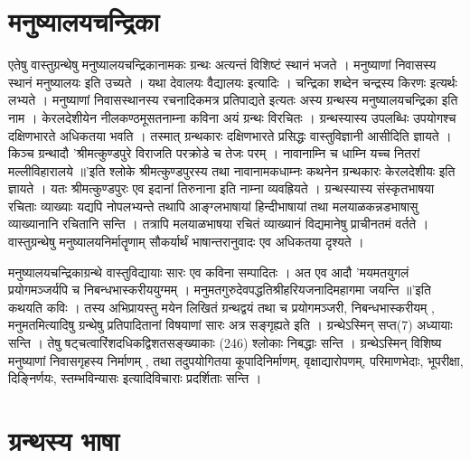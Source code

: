 \section{मनुष्यालयचन्द्रिका}

एतेषु वास्तुग्रन्थेषु मनुष्यालयचन्द्रिकानामकः ग्रन्थः अत्यन्तं विशिष्टं स्थानं भजते । मनुष्याणां निवासस्य स्थानं मनुष्यालयः इति उच्यते । यथा देवालयः वैद्यालयः इत्यादिः । चन्द्रिका शब्देन चन्द्रस्य किरणः इत्यर्थः लभ्यते । मनुष्याणां निवासस्थानस्य रचनादिकमत्र प्रतिपाद्यते इत्यतः अस्य ग्रन्थस्य मनुष्यालयचन्द्रिका इति नाम । केरलदेशीयेन नीलकण्ठमूसतनाम्ना कविना अयं ग्रन्थः विरचितः । ग्रन्थस्यास्य उपलब्धिः उपयोगश्च दक्षिणभारते अधिकतया भवति । तस्मात् ग्रन्थकारः दक्षिणभारते प्रसिद्धः वास्तुविज्ञानी आसीदिति ज्ञायते । किञ्च ग्रन्थादौ 'श्रीमत्कुण्डपुरे विराजति परक्रोडे च तेजः परम् । नावानाम्नि च धाम्नि यच्च नितरां मल्लीविहारालये ॥'इति श्लोके श्रीमत्कुण्डपुरस्य तथा नावानामकधाम्नः कथनेन ग्रन्थकारः केरलदेशीयः इति ज्ञायते । यतः श्रीमत्कुण्डपुरः एव इदानां तिरुनाना इति नाम्ना व्यवह्रियते । ग्रन्थस्यास्य संस्कृतभाषया रचिताः व्याख्याः यद्यपि नोपलभ्यन्ते तथापि आङ्ग्लभाषायां हिन्दीभाषायां तथा मलयाळकन्नडभाषासु व्याख्यानानि रचितानि सन्ति । तत्रापि मलयाळभाषया रचितं व्याख्यानं विद्यमानेषु प्राचीनतमं वर्तते । वास्तुग्रन्थेषु मनुष्यालयनिर्मातॄणाम् सौकर्यार्थं भाषान्तरानुवादः एव अधिकतया दृश्यते ।

मनुष्यालयचन्द्रिकाग्रन्थे वास्तुविद्यायाः सारः एव कविना सम्पादितः । अत एव आदौ 'मयमतयुगलं प्रयोगमञ्जर्यपि च निबन्धभास्करीययुग्मम् । मनुमतगुरुदेवपद्धतिश्रीहरियजनादिमहागमा जयन्ति ॥'इति कथयति कविः । तस्य अभिप्रायस्तु मयेन लिखितं ग्रन्थद्वयं तथा च प्रयोगमञ्जरी, निबन्धभास्करीयम् , मनुमतमित्यादिषु ग्रन्थेषु प्रतिपादितानां विषयाणां सारः अत्र सङ्गृह्यते इति । ग्रन्थेऽस्मिन् सप्त(7) अध्यायाः सन्ति । तेषु षट्चत्वारिंशदधिकद्विशतसङ्ख्याकाः (246) श्लोकाः निबद्धाः सन्ति । ग्रन्थेऽस्मिन् विशिष्य मनुष्याणां निवासगृहस्य निर्माणम् , तथा तदुपयोगितया कूपादिनिर्माणम्, वृक्षाद्यारोपणम्, परिमाणभेदाः, भूपरीक्षा, दिङ्निर्णयः, स्तम्भविन्यासः इत्यादिविचाराः प्रदर्शिताः सन्ति ।

\section{ग्रन्थस्य भाषा}

